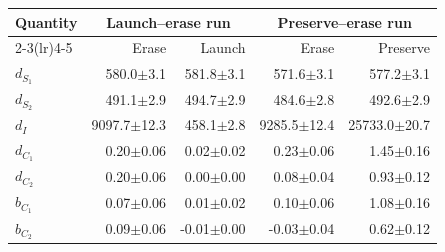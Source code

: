 \begingroup
\setlength{\tabcolsep}{3pt}
\begin{tabular}{@{}lrrrr@{}}
\toprule
Quantity & \multicolumn{2}{c}{Launch--erase run} & \multicolumn{2}{c}{Preserve--erase run} \\
\cmidrule(lr){2-3}\cmidrule(lr){4-5}
 & Erase & Launch & Erase & Preserve \\
\midrule
$d_{S_1}$ & 580.0\ensuremath{\pm}3.1 & 581.8\ensuremath{\pm}3.1 & 571.6\ensuremath{\pm}3.1 & 577.2\ensuremath{\pm}3.1 \\
$d_{S_2}$ & 491.1\ensuremath{\pm}2.9 & 494.7\ensuremath{\pm}2.9 & 484.6\ensuremath{\pm}2.8 & 492.6\ensuremath{\pm}2.9 \\
$d_I$ & 9097.7\ensuremath{\pm}12.3 & 458.1\ensuremath{\pm}2.8 & 9285.5\ensuremath{\pm}12.4 & 25733.0\ensuremath{\pm}20.7 \\
$d_{C_1}$ & 0.20\ensuremath{\pm}0.06 & 0.02\ensuremath{\pm}0.02 & 0.23\ensuremath{\pm}0.06 & 1.45\ensuremath{\pm}0.16 \\
$d_{C_2}$ & 0.20\ensuremath{\pm}0.06 & 0.00\ensuremath{\pm}0.00 & 0.08\ensuremath{\pm}0.04 & 0.93\ensuremath{\pm}0.12 \\
$b_{C_1}$ & 0.07\ensuremath{\pm}0.06 & 0.01\ensuremath{\pm}0.02 & 0.10\ensuremath{\pm}0.06 & 1.08\ensuremath{\pm}0.16 \\
$b_{C_2}$ & 0.09\ensuremath{\pm}0.06 & -0.01\ensuremath{\pm}0.00 & -0.03\ensuremath{\pm}0.04 & 0.62\ensuremath{\pm}0.12 \\
\bottomrule
\end{tabular}
\endgroup

